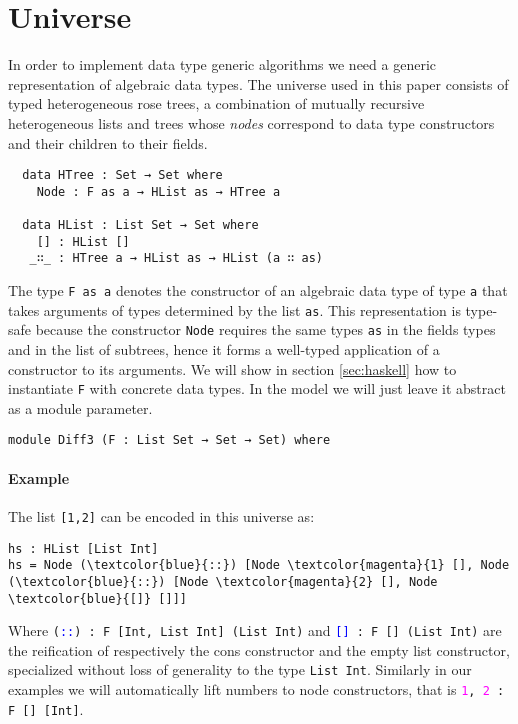 \documentclass[preprint]{sigplanconf}
\theoremstyle{plain}
\begin{document}
\section{Universe}
In order to implement data type generic algorithms we need a generic
representation of algebraic data types.
%
The universe used in this paper consists of typed heterogeneous rose
trees, a combination of mutually recursive heterogeneous lists and
trees whose \emph{nodes} correspond to data type constructors and
their children to their fields.
\begin{verbatim}
  data HTree : Set → Set where
    Node : F as a → HList as → HTree a

  data HList : List Set → Set where
    [] : HList []
   _∷_ : HTree a → HList as → HList (a ∷ as)
\end{verbatim}
	The type \texttt{F as a} denotes the constructor of an algebraic data
	type of type \texttt{a} that takes arguments of types determined by the list 
	\texttt{as}.
        This representation is type-safe because the constructor
        \texttt{Node} requires the same types \texttt{as} in the
        fields types and in the list of subtrees, hence it forms a
        well-typed application of a constructor to its arguments.
	We will show in section \ref{sec:haskell} how to instantiate \texttt{F} with concrete 
        data types. In the model we will just leave it abstract as a module parameter.
\begin{verbatim}
module Diff3 (F : List Set → Set → Set) where
\end{verbatim}
	
        \paragraph{Example} 
        The list \texttt{[1,2]} can be encoded in this universe as: 
\begin{Verbatim}[commandchars=\\\{\}]
hs : HList [List Int]
hs = Node (\textcolor{blue}{::}) [Node \textcolor{magenta}{1} [], Node (\textcolor{blue}{::}) [Node \textcolor{magenta}{2} [], Node \textcolor{blue}{[]} []]]
\end{Verbatim}
        Where \texttt{(\textcolor{blue}{::}) : F [Int, List Int] (List Int)}
        and \texttt{\textcolor{blue}{[]} : F [] (List Int)} are the reification of respectively the cons constructor and the
        empty list constructor, specialized without loss of generality to the type \texttt{List Int}.
        Similarly in our examples we will automatically lift numbers to node constructors, that is
        \texttt{\textcolor{magenta}{1}, \textcolor{magenta}{2} : F [] [Int]}.
\end{document}
